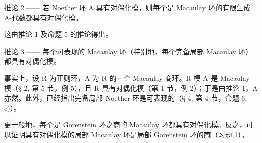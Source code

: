 推论 2.—— 若 Noether 环 A 具有对偶化模，则每个是 Macaulay 环的有限生成 A-代数都具有对偶化模。

这由推论 1 及命题 5 的推论得出。

推论 3.—— 每个可表现的 Macaulay 环（特别地，每个完备局部 Macaulay 环）都具有对偶化模。

事实上，设 R 为正则环，A 为 R 的一个 Macaulay 商环。R-模 A 是 Macaulay 模（§ 2, 第 5 节，例 5），且 R 具有对偶化模（第 1 节，例 2）；于是由推论 1，A 亦然。此外，已经指出完备局部 Noether 环是可表现的（§ 4, 第 4 节，命题 6, c)）。

更一般地，每个是 Gorenstein 环之商的 Macaulay 环都具有对偶化模。反之，可以证明具有对偶化模的局部 Macaulay 环是局部 Gorenstein 环的商（习题 1）。

